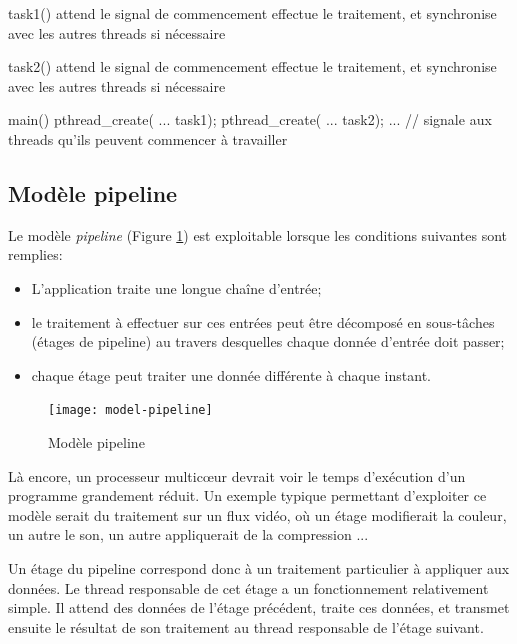 \begin{codeblock}[list text={Création Thread},title={Création de threads}]
task1() {
  attend le signal de commencement
  effectue le traitement, et synchronise avec les autres threads si nécessaire
}

task2() {
  attend le signal de commencement
  effectue le traitement, et synchronise avec les autres threads si nécessaire
}

main() {
  pthread_create( ... task1);
  pthread_create( ... task2);
  ...
  // signale aux threads qu'ils peuvent commencer à travailler
}


\end{codeblock}

\subsection{Modèle pipeline}

Le modèle \emph{pipeline} (Figure \ref{fig:model-pipeline}) est exploitable lorsque les conditions suivantes sont remplies:

\begin{itemize}
  \item L'application traite une longue chaîne d'entrée;
  \item le traitement à effectuer sur ces entrées peut être décomposé en sous-tâches (étages de pipeline) au travers desquelles chaque donnée d'entrée doit passer;
  \item chaque étage peut traiter une donnée différente à chaque instant.
\end{itemize}

\begin{figure}[ht]
  \centering
  \texttt{[image: model-pipeline]}
  \caption{\label{fig:model-pipeline}Modèle pipeline}
\end{figure}


Là encore, un processeur multicœur devrait voir le temps d'exécution d'un programme grandement réduit. Un exemple typique permettant d'exploiter ce modèle serait du traitement sur un flux vidéo, où un étage modifierait la couleur, un autre le son, un autre appliquerait de la compression ...

Un étage du pipeline correspond donc à un traitement particulier à appliquer aux données. Le thread responsable de cet étage a un fonctionnement relativement simple. Il attend des données de l'étage précédent, traite ces données, et transmet ensuite le résultat de son traitement au thread responsable de l'étage suivant.


